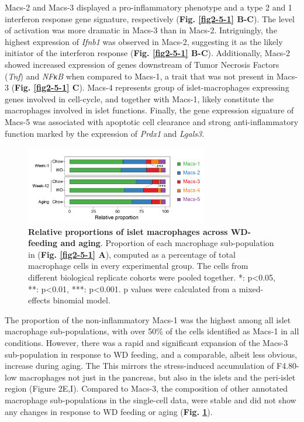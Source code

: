  Macs-2 and Macs-3 displayed a pro-inflammatory phenotype and  a type 2 and 1 interferon response gene signature, respectively (\textbf{Fig. \ref{fig2-5-1} B-C}). The level of activation was more dramatic in Macs-3 than in Macs-2. Intriguingly, the highest expression of \textit{Ifnb1} was observed in Macs-2, suggesting it as the likely initiator of the interferon response (\textbf{Fig. \ref{fig2-5-1} B-C}). Additionally, Macs-2 showed increased expression of genes downstream of Tumor Necrosis Factors (\textit{Tnf}) and \textit{NFκB} when compared to Macs-1, a trait that was not present in Macs-3 (\textbf{Fig. \ref{fig2-5-1} C}). Macs-4 represents group of islet-macrophages expressing genes involved in cell-cycle, and together with Macs-1, likely constitute the macrophages involved in islet functions. Finally, the gene expression signature of Macs-5 was associated with apoptotic cell clearance and strong anti-inflammatory function marked by the expression of \textit{Prdx1} and \textit{Lgals3}.
\clearpage



\begin{figure}
\includegraphics[width=8cm]{Chapter4/Fig/F2-5-03.png}
\caption[res-macs2]{\textbf{Relative proportions of islet macrophages across WD-feeding and aging}. Proportion of each macrophage sub-population in (\textbf{Fig. \ref{fig2-5-1} A}), computed as a percentage of total macrophage cells in every experimental group. The cells from different biological replicate cohorts were pooled together. *: p<0.05, **: p<0.01, ***: p<0.001. p values were calculated from a mixed-effects binomial model.  }
\label{fig2-5-2}
\end{figure}

The proportion of the non-inflammatory Macs-1 was the highest among all islet macrophage sub-populations, with over 50\% of the cells identified as Macs-1 in all conditions. However, there was a rapid and significant expansion of the Macs-3 sub-population in response to WD feeding, and a comparable, albeit less obvious, increase during aging. The This mirrors the stress-induced accumulation of F4.80-low macrophages not just in the pancreas, but also in the islets and the peri-islet region (Figure 2E,I). Compared to Macs-3, the composition of other annotated macrophage sub-populations in the single-cell data, were stable and did not show any changes in response to WD feeding or aging (\textbf{Fig. \ref{fig2-5-2}}).

